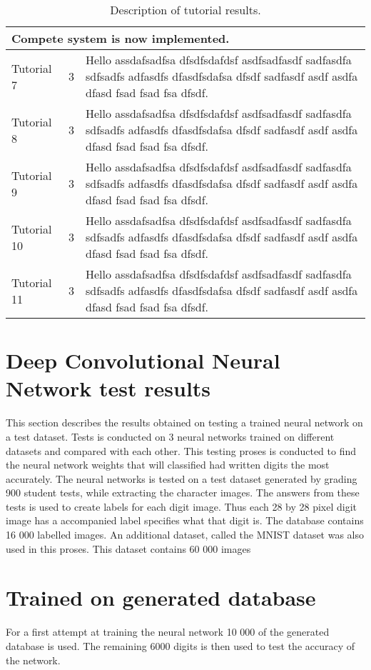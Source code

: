 \begin{table}
\caption{Description of tutorial results.} \label{tbl:tutResults2}
  \centering
\begin{tabular}{|p{3cm}|p{3cm}|p{5cm}|}
\hline
\multicolumn{3}{|l|}{Compete system is now implemented.}\\
\hline
Tutorial 7&3&Hello assdafsadfsa dfsdfsdafdsf asdfsadfasdf sadfasdfa sdfsadfs adfasdfs dfasdfsdafsa dfsdf sadfasdf asdf asdfa dfasd fsad fsad fsa dfsdf.\\
\hline
Tutorial 8&3&Hello assdafsadfsa dfsdfsdafdsf asdfsadfasdf sadfasdfa sdfsadfs adfasdfs dfasdfsdafsa dfsdf sadfasdf asdf asdfa dfasd fsad fsad fsa dfsdf.\\
\hline
Tutorial 9&3&Hello assdafsadfsa dfsdfsdafdsf asdfsadfasdf sadfasdfa sdfsadfs adfasdfs dfasdfsdafsa dfsdf sadfasdf asdf asdfa dfasd fsad fsad fsa dfsdf.\\
\hline
Tutorial 10&3&Hello assdafsadfsa dfsdfsdafdsf asdfsadfasdf sadfasdfa sdfsadfs adfasdfs dfasdfsdafsa dfsdf sadfasdf asdf asdfa dfasd fsad fsad fsa dfsdf.\\
\hline
Tutorial 11&3&Hello assdafsadfsa dfsdfsdafdsf asdfsadfasdf sadfasdfa sdfsadfs adfasdfs dfasdfsdafsa dfsdf sadfasdf asdf asdfa dfasd fsad fsad fsa dfsdf.\\
\hline
\end{tabular}
\end{table}
\section{Deep Convolutional Neural Network test results}
\label{sec:DCNNresult}

This section describes the results obtained on testing a trained neural network on a test dataset. Tests is conducted on 3 neural networks trained on different datasets and compared with each other. This testing proses is conducted to find the neural network weights that will classified had written digits the most accurately. The neural networks is tested on a test dataset generated by grading 900 student tests, while extracting the character images. The answers from these tests is used to create labels for each digit image. Thus each 28 by 28 pixel digit image has a accompanied label specifies what that digit is. The database contains 16 000 labelled images. An additional dataset, called the MNIST dataset was also used in this proses. This dataset contains 60 000 images 
\section{Trained on generated database}
For a first attempt at training the neural network 10 000 of the generated database is used. The remaining 6000 digits is then used to test the accuracy of the network.

